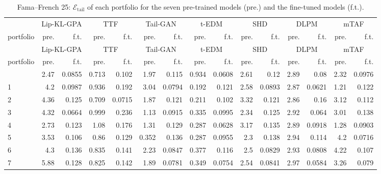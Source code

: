 \begin{longtable}{l rr rr rr rr rr rr rr}
\caption{Fama--French 25: $\mathcal{E}_{\mathrm{tail}}$ of each portfolio for the seven pre-trained models (pre.) and the fine-tuned models (f.t.).}\label{tab:ff25_tail}\\ \toprule
 & \multicolumn{2}{c}{Lip-KL-GPA} & \multicolumn{2}{c}{TTF} & \multicolumn{2}{c}{Tail-GAN} & \multicolumn{2}{c}{t-EDM} & \multicolumn{2}{c}{SHD} & \multicolumn{2}{c}{DLPM} & \multicolumn{2}{c}{mTAF}\\
\cmidrule(lr){2-3} \cmidrule(lr){4-5} \cmidrule(lr){6-7} \cmidrule(lr){8-9} \cmidrule(lr){10-11} \cmidrule(lr){12-13} \cmidrule(lr){14-15}
portfolio & pre. & f.t. & pre. & f.t. & pre. & f.t. & pre. & f.t. & pre. & f.t. & pre. & f.t. & pre. & f.t.\\ \midrule \endfirsthead
\toprule  & \multicolumn{2}{c}{Lip-KL-GPA} & \multicolumn{2}{c}{TTF} & \multicolumn{2}{c}{Tail-GAN} & \multicolumn{2}{c}{t-EDM} & \multicolumn{2}{c}{SHD} & \multicolumn{2}{c}{DLPM} & \multicolumn{2}{c}{mTAF}\\
\cmidrule(lr){2-3} \cmidrule(lr){4-5} \cmidrule(lr){6-7} \cmidrule(lr){8-9} \cmidrule(lr){10-11} \cmidrule(lr){12-13} \cmidrule(lr){14-15}
portfolio & pre. & f.t. & pre. & f.t. & pre. & f.t. & pre. & f.t. & pre. & f.t. & pre. & f.t. & pre. & f.t.\\ \midrule \endhead \bottomrule \endfoot
0 & 2.47 & {0.0855} & 0.713 & {0.102} & 1.97 & {0.115} & 0.934 & {0.0608} & 2.61 & {0.12} & 2.89 & {0.08} & 2.32 & {0.0976}\\
1 & 4.2 & {0.0987} & 0.936 & {0.192} & 3.04 & {0.0794} & 0.192 & {0.121} & 2.58 & {0.0893} & 2.87 & {0.0621} & 1.21 & {0.122}\\
2 & 4.36 & {0.125} & 0.709 & {0.0715} & 1.87 & {0.121} & 0.211 & {0.102} & 3.32 & {0.121} & 2.86 & {0.16} & 3.12 & {0.112}\\
3 & 4.32 & {0.0664} & 0.999 & {0.236} & 1.13 & {0.0915} & 0.335 & {0.0995} & 2.34 & {0.125} & 2.92 & {0.064} & 3.01 & {0.138}\\
4 & 2.73 & {0.123} & 1.08 & {0.176} & 1.31 & {0.129} & 0.287 & {0.0628} & 3.17 & {0.135} & 2.89 & {0.0918} & 1.28 & {0.0903}\\
5 & 3.53 & {0.106} & 0.86 & {0.129} & 0.352 & {0.136} & 0.287 & {0.0955} & 2.3 & {0.138} & 2.94 & {0.114} & 4.2 & {0.0716}\\
6 & 4.3 & {0.136} & 0.835 & {0.141} & 2.23 & {0.0847} & 0.377 & {0.116} & 2.5 & {0.0829} & 2.93 & {0.0808} & 4.22 & {0.107}\\
7 & 5.88 & {0.128} & 0.825 & {0.142} & 1.89 & {0.0781} & 0.349 & {0.0754} & 2.54 & {0.0841} & 2.97 & {0.0584} & 3.26 & {0.079}\\

\end{longtable}
